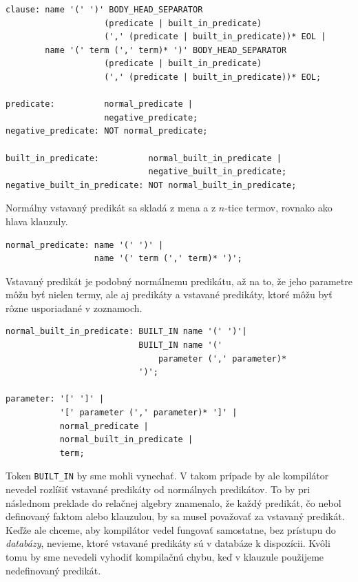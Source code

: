 \newpage

\begin{verbatim}
clause: name '(' ')' BODY_HEAD_SEPARATOR 
                    (predicate | built_in_predicate) 
                    (',' (predicate | built_in_predicate))* EOL |
        name '(' term (',' term)* ')' BODY_HEAD_SEPARATOR 
                    (predicate | built_in_predicate)
                    (',' (predicate | built_in_predicate))* EOL;

predicate:          normal_predicate |
                    negative_predicate;
negative_predicate: NOT normal_predicate;

built_in_predicate:          normal_built_in_predicate |
                             negative_built_in_predicate;
negative_built_in_predicate: NOT normal_built_in_predicate;
\end{verbatim}

Normálny vstavaný predikát sa skladá z mena a z $n$-tice termov, rovnako ako hlava klauzuly. 

\begin{verbatim}
normal_predicate: name '(' ')' |
                  name '(' term (',' term)* ')';
\end{verbatim}

Vstavaný predikát je podobný normálnemu predikátu, až na to, že jeho parametre môžu byť nielen
termy, ale aj predikáty a vstavané predikáty, ktoré môžu byť rôzne usporiadané v zoznamoch.

\begin{verbatim}
normal_built_in_predicate: BUILT_IN name '(' ')'|
                           BUILT_IN name '(' 
                               parameter (',' parameter)* 
                           ')';

parameter: '[' ']' |
           '[' parameter (',' parameter)* ']' |
           normal_predicate |
           normal_built_in_predicate |
           term;
\end{verbatim}

Token \verb|BUILT_IN| by sme mohli vynechať. V takom prípade by ale kompilátor nevedel rozlíšiť
vstavané predikáty od normálnych predikátov. To by pri následnom preklade do relačnej algebry
znamenalo, že každý predikát, čo nebol definovaný faktom alebo klauzulou, by sa musel považovať za
vstavaný predikát. Keďže ale chceme, aby kompilátor vedel fungovať samostatne, bez prístupu do
\textit{databázy}, nevieme, ktoré vstavané predikáty sú v databáze k dispozícii. Kvôli tomu by sme
nevedeli vyhodiť kompilačnú chybu, keď v klauzule použijeme nedefinovaný predikát.

